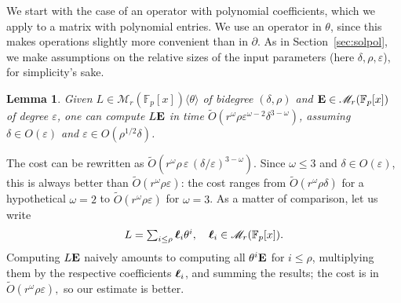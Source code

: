 \documentclass{sig-alternate}
\def\bell{\mbox{\boldmath$\ell$}}
\newcommand{\bigOsoft}{\tilde{O}}
\def\F {\mathbb{F}}
\def\mE {\ensuremath{{\bf E}}}
\newtheorem{Lemma}{Lemma}
\begin{document}
\smallskip{} We start with the case
of an operator with polynomial coefficients, which we apply to a
matrix with polynomial entries. We use an operator in $\theta$, since
this makes operations slightly more convenient than in $\partial$. As
in Section~\ref{sec:solpol}, we make assumptions on the relative sizes
of the input parameters (here $\delta, \rho, \varepsilon$), for
simplicity's sake. 
\begin{Lemma}\label{Prop:2}
  Given $L \in \mathscr{M}_r(\F_p[x])\langle \theta \rangle$ of
  bidegree $(\delta,\rho)$ and $\mE \in \mathscr{M}_r(\F_p[x])$ of
  degree $\varepsilon$, one can compute $L \mE$ in time
  $\bigOsoft(r^\omega \rho \varepsilon^{\omega-2} \delta^{3-\omega})$,
  assuming $\delta \in O(\varepsilon)$ and $\varepsilon \in
  O(\rho^{1/2} \delta)$.
\end{Lemma}
The cost can be rewritten as $\bigOsoft(r^\omega \rho\, \varepsilon\,
(\delta/\varepsilon)^{3-\omega})$. Since $\omega \le 3$ and $\delta \in O(\varepsilon)$, this is always better than $\bigOsoft(r^\omega \rho
\varepsilon)$: the cost ranges from $\bigOsoft(r^\omega \rho \delta)$
for a hypothetical $\omega=2$ to $\bigOsoft(r^\omega \rho
\varepsilon)$ for $\omega=3$. As a matter of comparison, let us write
$$
\begin{array}{c}
L=\sum_{i\le \rho}\bell_i \theta^i, \quad \bell_i \in \mathscr{M}_r(\F_p[x]).
\end{array}
$$Computing $L\mE$
naively amounts to computing all $\theta^i \mE$ for $i \le \rho$,
multiplying them by the respective coefficients $\bell_i$, and summing
the results; the cost is in $\bigOsoft(r^\omega \rho \varepsilon),$ so
our estimate is better. 
\end{document}
